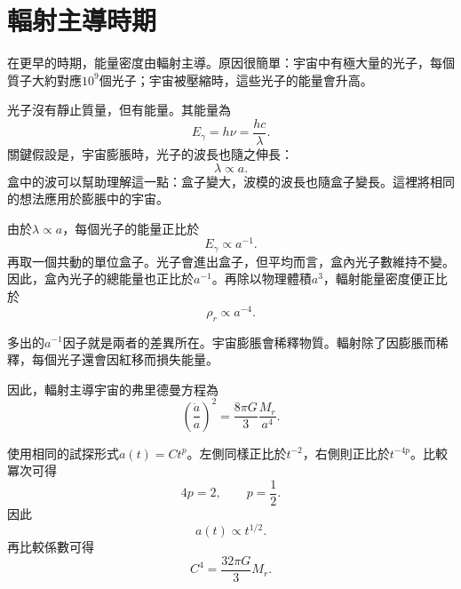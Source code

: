 \section{輻射主導時期}

在更早的時期，能量密度由輻射主導。原因很簡單：宇宙中有極大量的光子，每個質子大約對應\(10^9\)個光子；宇宙被壓縮時，這些光子的能量會升高。

光子沒有靜止質量，但有能量。其能量為
\begin{equation}
E_\gamma=h\nu=\frac{hc}{\lambda}.
\end{equation}
關鍵假設是，宇宙膨脹時，光子的波長也隨之伸長：
\begin{equation}
\lambda\propto a.
\end{equation}
盒中的波可以幫助理解這一點：盒子變大，波模的波長也隨盒子變長。這裡將相同的想法應用於膨脹中的宇宙。

由於\(\lambda\propto a\)，每個光子的能量正比於
\begin{equation}
E_\gamma\propto a^{-1}.
\end{equation}
再取一個共動的單位盒子。光子會進出盒子，但平均而言，盒內光子數維持不變。因此，盒內光子的總能量也正比於\(a^{-1}\)。再除以物理體積\(a^3\)，輻射能量密度便正比於
\begin{equation}
\rho_r\propto a^{-4}.
\end{equation}

多出的\(a^{-1}\)因子就是兩者的差異所在。宇宙膨脹會稀釋物質。輻射除了因膨脹而稀釋，每個光子還會因紅移而損失能量。

因此，輻射主導宇宙的弗里德曼方程為
\begin{equation}
\left(\frac{\dot a}{a}\right)^2=\frac{8\pi G}{3}\frac{M_r}{a^4}.
\end{equation}

使用相同的試探形式\(a(t)=Ct^p\)。左側同樣正比於\(t^{-2}\)，右側則正比於\(t^{-4p}\)。比較冪次可得
\begin{equation}
4p=2,
\qquad
p=\frac{1}{2}.
\end{equation}
因此
\begin{equation}
a(t)\propto t^{1/2}.
\end{equation}
再比較係數可得
\begin{equation}
C^4=\frac{32\pi G}{3}M_r.
\end{equation}

\begin{classroomqa}
\end{classroomqa}

